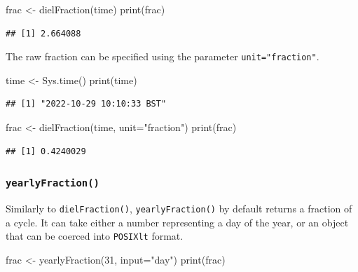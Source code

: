 \documentclass[
]{book}
\newenvironment{Shaded}{\begin{snugshade}}{\end{snugshade}}
\newcommand{\AttributeTok}[1]{\textcolor[rgb]{0.77,0.63,0.00}{#1}}
\newcommand{\DecValTok}[1]{\textcolor[rgb]{0.00,0.00,0.81}{#1}}
\newcommand{\FunctionTok}[1]{\textcolor[rgb]{0.00,0.00,0.00}{#1}}
\newcommand{\NormalTok}[1]{#1}
\newcommand{\OtherTok}[1]{\textcolor[rgb]{0.56,0.35,0.01}{#1}}
\newcommand{\StringTok}[1]{\textcolor[rgb]{0.31,0.60,0.02}{#1}}
\begin{document}
\begin{Shaded}
\begin{Highlighting}[]
\NormalTok{frac }\OtherTok{\textless{}{-}} \FunctionTok{dielFraction}\NormalTok{(time)}
\FunctionTok{print}\NormalTok{(frac)}
\end{Highlighting}
\end{Shaded}

\begin{verbatim}
## [1] 2.664088
\end{verbatim}

The raw fraction can be specified using the parameter \texttt{unit="fraction"}.

\begin{Shaded}
\begin{Highlighting}[]
\NormalTok{time }\OtherTok{\textless{}{-}} \FunctionTok{Sys.time}\NormalTok{()}
\FunctionTok{print}\NormalTok{(time)}
\end{Highlighting}
\end{Shaded}

\begin{verbatim}
## [1] "2022-10-29 10:10:33 BST"
\end{verbatim}

\begin{Shaded}
\begin{Highlighting}[]
\NormalTok{frac }\OtherTok{\textless{}{-}} \FunctionTok{dielFraction}\NormalTok{(time, }\AttributeTok{unit=}\StringTok{"fraction"}\NormalTok{)}
\FunctionTok{print}\NormalTok{(frac)}
\end{Highlighting}
\end{Shaded}

\begin{verbatim}
## [1] 0.4240029
\end{verbatim}

\hypertarget{yearlyfraction}{%
\subsubsection{\texorpdfstring{\texttt{yearlyFraction()}}{yearlyFraction()}}\label{yearlyfraction}}

Similarly to \texttt{dielFraction()}, \texttt{yearlyFraction()} by default returns a fraction of a cycle. It can take either a number representing a day of the year, or an object that can be coerced into \texttt{POSIXlt} format.

\begin{Shaded}
\begin{Highlighting}[]
\NormalTok{frac }\OtherTok{\textless{}{-}} \FunctionTok{yearlyFraction}\NormalTok{(}\DecValTok{31}\NormalTok{, }\AttributeTok{input=}\StringTok{"day"}\NormalTok{)}
\FunctionTok{print}\NormalTok{(frac)}
\end{Highlighting}
\end{Shaded}
\end{document}
